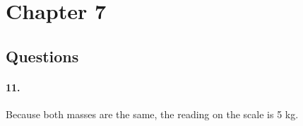 


\renewcommand\assignment{HW 6, Due Friday, 3/3/2023 23:59; \S7 Q: \#11 P: \#42, 45 \S8 P: \#13, 22 ,26, 30, 51, 56}
\setlength{\belowdisplayskip}{0pt} \setlength{\belowdisplayshortskip}{0pt}
\setlength{\abovedisplayskip}{0pt} \setlength{\abovedisplayshortskip}{0pt}



    \iffalse
    \begin{equation*}
        \begin{gathered}
            Equations go here.
        \end{gathered}
    \end{equation*}

    \resizebox{\hsize}{!}{$Long equation goes here$}

    \begin{multicol*}{# of columns}
    \end{multicol*}

    \horizontal

    \fi


    \section*{Chapter 7}

    \subsection*{Questions}

    \paragraph*{11.}\mbox{}

    Because both masses are the same, the reading on the scale is 5 kg.


